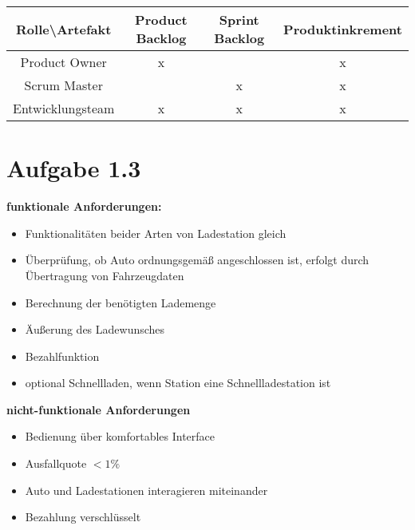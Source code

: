 \documentclass[a4paper,11pt]{scrartcl}
\begin{document}
	\begin{table}[h!]
		\begin{tabular}{c|c|c|c}
		 \textbf{Rolle\textbackslash Artefakt} & Product Backlog & Sprint Backlog & Produktinkrement \\
		 \hline
		 Product Owner		&x &  &x \\
		 Scrum Master		&  &x &x \\
		 Entwicklungsteam	&x &x &x \\
		\end{tabular}
	\end{table}

	\section*{Aufgabe 1.3}
	\textbf{funktionale Anforderungen:}
	\begin{itemize}
		\item Funktionalitäten beider Arten von Ladestation gleich
		\item Überprüfung, ob Auto ordnungsgemäß angeschlossen ist, erfolgt durch Übertragung von Fahrzeugdaten
		\item Berechnung der benötigten Lademenge
		\item Äußerung des Ladewunsches
		\item Bezahlfunktion
		\item optional Schnellladen, wenn Station eine Schnellladestation ist
	\end{itemize}
	\textbf{nicht-funktionale Anforderungen}
	\begin{itemize}
		\item Bedienung über komfortables Interface
		\item Ausfallquote $< 1\%$
		\item Auto und Ladestationen interagieren miteinander
		\item Bezahlung verschlüsselt
	\end{itemize}
	
	
\end{document}
